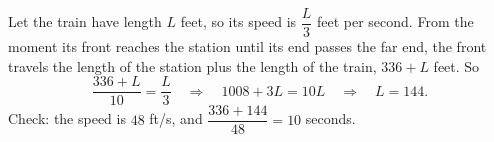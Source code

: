 Let the train have length $L$ feet, so its speed is $\dfrac {L}{3}$ feet per second. From the moment its front reaches the station until its end passes the far end, the front travels the length of the station plus the length of the train, $336+L$ feet. So
\[
\dfrac{336+L}{10}=\dfrac {L}{3}\quad\Longrightarrow\quad 1008+3L=10L\quad\Longrightarrow\quad L=\boxed{144}.
\]
Check: the speed is $48$ ft/s, and $\dfrac{336+144}{48}=10$ seconds.
